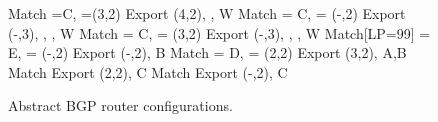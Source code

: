 \begin{figure}[t!]
\begin{code}
    Match \PEER=C, \COMM=(3,2)
      Export \COMM \Arrow (4,2), \MED {}, \PEER \Arrow W
    Match \PEER = C, \COMM = (-,2)
      Export \COMM \Arrow (-,3), \COMM \Arrow {},
             \MED {}, \PEER \Arrow W
    Match \PEER = C, \COMM = (3,2)
      Export \COMM \Arrow (-,3), \COMM \Arrow {},
             \MED {}, \PEER \Arrow W
    Match[LP=99] \PEER = E, \COMM = (-,2) 
      Export \COMM \Arrow (-,2), \PEER \Arrow B
    Match \PEER = D, \COMM = (2,2)
      Export \COMM \Arrow (3,2), \PEER \Arrow A,B
    Match 
      Export \COMM \Arrow (2,2), \PEER \Arrow C
    Match 
      Export \COMM \Arrow (-,2), \PEER \Arrow C
  \end{code}
  \vspace{-2em} 
  \caption{Abstract BGP router configurations. \label{fig:abgp-config}}
  \vspace{-1em}
\end{figure}



